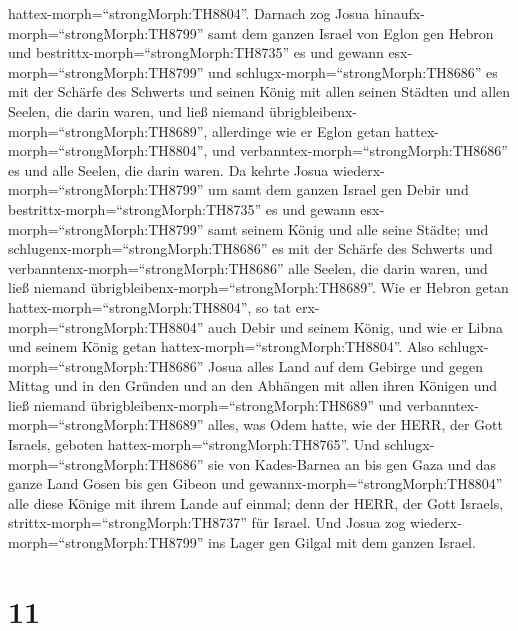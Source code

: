 hattex-morph=``strongMorph:TH8804''.  Darnach zog Josua
hinaufx-morph=``strongMorph:TH8799'' samt dem ganzen Israel von Eglon
gen Hebron und bestrittx-morph=``strongMorph:TH8735'' es 
und gewann esx-morph=``strongMorph:TH8799'' und
schlugx-morph=``strongMorph:TH8686'' es mit der Schärfe des Schwerts und
seinen König mit allen seinen Städten und allen Seelen, die darin waren,
und ließ niemand übrigbleibenx-morph=``strongMorph:TH8689'', allerdinge
wie er Eglon getan hattex-morph=``strongMorph:TH8804'', und
verbanntex-morph=``strongMorph:TH8686'' es und alle Seelen, die darin
waren.  Da kehrte Josua
wiederx-morph=``strongMorph:TH8799'' um samt dem ganzen Israel gen Debir
und bestrittx-morph=``strongMorph:TH8735'' es  und gewann
esx-morph=``strongMorph:TH8799'' samt seinem König und alle seine
Städte; und schlugenx-morph=``strongMorph:TH8686'' es mit der Schärfe
des Schwerts und verbanntenx-morph=``strongMorph:TH8686'' alle Seelen,
die darin waren, und ließ niemand
übrigbleibenx-morph=``strongMorph:TH8689''. Wie er Hebron getan
hattex-morph=``strongMorph:TH8804'', so tat
erx-morph=``strongMorph:TH8804'' auch Debir und seinem König, und wie er
Libna und seinem König getan hattex-morph=``strongMorph:TH8804''.
 Also schlugx-morph=``strongMorph:TH8686'' Josua alles Land
auf dem Gebirge und gegen Mittag und in den Gründen und an den Abhängen
mit allen ihren Königen und ließ niemand
übrigbleibenx-morph=``strongMorph:TH8689'' und
verbanntex-morph=``strongMorph:TH8689'' alles, was Odem hatte, wie der
HERR, der Gott Israels, geboten hattex-morph=``strongMorph:TH8765''.
 Und schlugx-morph=``strongMorph:TH8686'' sie von
Kades-Barnea an bis gen Gaza und das ganze Land Gosen bis gen Gibeon
 und gewannx-morph=``strongMorph:TH8804'' alle diese Könige
mit ihrem Lande auf einmal; denn der HERR, der Gott Israels,
strittx-morph=``strongMorph:TH8737'' für Israel.  Und Josua
zog wiederx-morph=``strongMorph:TH8799'' ins Lager gen Gilgal mit dem
ganzen Israel.

\hypertarget{section-10}{%
\section{11}\label{section-10}}

